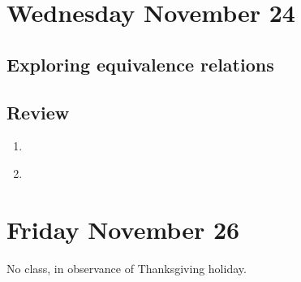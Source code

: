 \section*{Wednesday November 24}
\subsection*{Exploring equivalence relations}








\newpage

\newpage
\subsection*{Review}
\begin{enumerate}
    \item \hspace{1in}\\ 
    \item \hspace{1in}\\ 
\end{enumerate}

\newpage
\section*{Friday November 26}

No class, in observance of Thanksgiving holiday.

